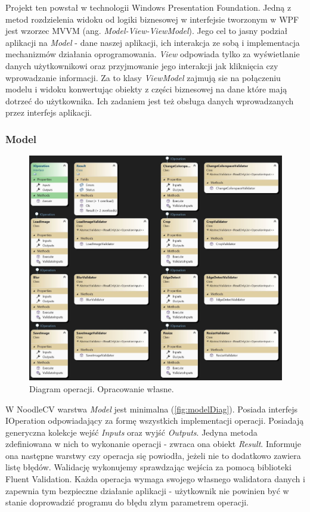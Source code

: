 
Projekt ten powstał w technologii Windows Presentation Foundation. 
Jedną z metod rozdzielenia widoku od logiki biznesowej w interfejsie tworzonym w WPF jest wzorzec MVVM (ang. \textit{Model-View-ViewModel}). 
Jego cel to jasny podział aplikacji na \textit{Model} - dane naszej aplikacji, ich interakcja ze sobą i implementacja mechanizmów działania oprogramowania. 
\textit{View} odpowiada tylko za wyświetlanie danych użytkownikowi oraz przyjmowanie jego interakcji jak kliknięcia czy wprowadzanie informacji. 
Za to klasy \textit{ViewModel} zajmują sie na połączeniu modelu i widoku konwertując obiekty z części biznesowej na dane które mają dotrzeć do użytkownika. 
Ich zadaniem jest też obsługa danych wprowadzanych przez interfejs aplikacji.

\subsubsection{Model}

\begin{figure}[H]
    \centering
    \includegraphics[width=1\linewidth]{images/Picture11.jpg}
    \caption{Diagram operacji. Opracowanie własne.}
    \label{fig:modelDiag}
\end{figure}

W NoodleCV warstwa \textit{Model} jest minimalna (\autoref{fig:modelDiag}). 
Posiada interfejs IOperation odpowiadający za formę wszystkich implementacji operacji. 
Posiadają generyczna kolekcje wejść \textit{Inputs} oraz wyjść \textit{Outputs}.
Jedyna metoda zdefiniowana w nich to wykonanie operacji - zwraca ona obiekt \textit{Result}.
Informuje ona następne warstwy czy operacja się powiodła, jeżeli nie to dodatkowo zawiera listę błędów. 
Walidację wykonujemy sprawdzając wejścia za pomocą biblioteki Fluent Validation. 
Każda operacja wymaga swojego własnego walidatora danych i zapewnia tym bezpieczne działanie aplikacji - użytkownik nie powinien być w stanie doprowadzić programu do błędu złym parametrem operacji.

